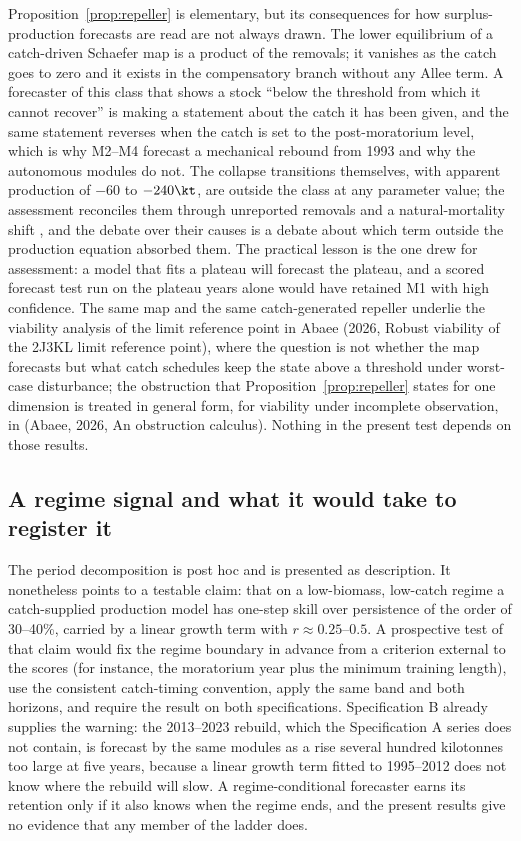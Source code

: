 Proposition~\ref{prop:repeller} is elementary, but its consequences for how surplus-production forecasts are read are not always drawn. The lower equilibrium of a catch-driven Schaefer map is a product of the removals; it vanishes as the catch goes to zero and it exists in the compensatory branch without any Allee term. A forecaster of this class that shows a stock ``below the threshold from which it cannot recover'' is making a statement about the catch it has been given, and the same statement reverses when the catch is set to the post-moratorium level, which is why M2--M4 forecast a mechanical rebound from 1993 and why the autonomous modules do not. The collapse transitions themselves, with apparent production of $-60$ to $-240\kt$, are outside the class at any parameter value; the assessment reconciles them through unreported removals and a natural-mortality shift \citep{Cadigan2016}, and the debate over their causes \citep{Hutchings1994,Walters1996,Myers1997,Shelton1999} is a debate about which term outside the production equation absorbed them. The practical lesson is the one \citet{Walters1996} drew for assessment: a model that fits a plateau will forecast the plateau, and a scored forecast test run on the plateau years alone would have retained M1 with high confidence. The same map and the same catch-generated repeller underlie the viability analysis of the limit reference point in Abaee (2026, Robust viability of the 2J3KL limit reference point), where the question is not whether the map forecasts but what catch schedules keep the state above a threshold under worst-case disturbance; the obstruction that Proposition~\ref{prop:repeller} states for one dimension is treated in general form, for viability under incomplete observation, in (Abaee, 2026, An obstruction calculus). Nothing in the present test depends on those results.

\subsection{A regime signal and what it would take to register it}\label{sec:regimesignal}

The period decomposition is post hoc and is presented as description. It nonetheless points to a testable claim: that on a low-biomass, low-catch regime a catch-supplied production model has one-step skill over persistence of the order of 30--40\%, carried by a linear growth term with $r\approx 0.25$--$0.5$. A prospective test of that claim would fix the regime boundary in advance from a criterion external to the scores (for instance, the moratorium year plus the minimum training length), use the consistent catch-timing convention, apply the same band and both horizons, and require the result on both specifications. Specification B already supplies the warning: the 2013--2023 rebuild, which the Specification A series does not contain, is forecast by the same modules as a rise several hundred kilotonnes too large at five years, because a linear growth term fitted to 1995--2012 does not know where the rebuild will slow. A regime-conditional forecaster earns its retention only if it also knows when the regime ends, and the present results give no evidence that any member of the ladder does.

